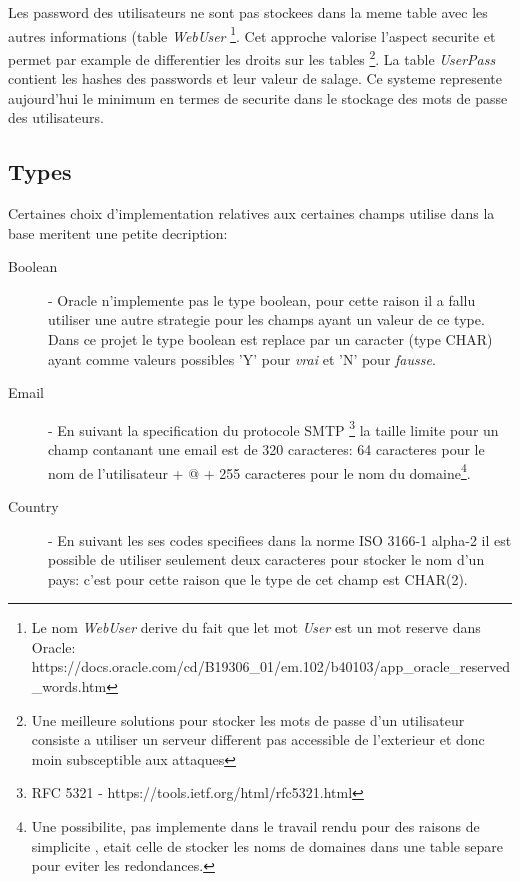 \documentclass[twoside,openright,a4paper,11pt,french]{article}
\begin{document}
Les password des utilisateurs ne sont pas stockees dans la meme table avec les
autres informations (table {\it WebUser}
\footnote{Le nom {\it WebUser} derive du fait que let mot {\it User} est un mot reserve dans Oracle:
https://docs.oracle.com/cd/B19306\_01/em.102/b40103/app\_oracle\_reserved\_words.htm}.
Cet approche valorise l'aspect securite et permet par
example de differentier les droits sur les tables
\footnote{Une meilleure solutions pour stocker les mots de passe d'un
utilisateur consiste a utiliser un serveur different pas accessible de
l'exterieur et donc  moin subsceptible aux attaques}.
La table {\it UserPass} contient les hashes des passwords et leur valeur de
salage.  Ce systeme represente aujourd'hui le minimum en termes de securite
dans le stockage des mots de passe des utilisateurs.


\subsection{Types}
Certaines choix d'implementation relatives aux certaines champs utilise dans la
base meritent une petite decription:


\begin{description}
\item[Boolean] - Oracle n'implemente pas le type boolean, pour cette raison il a
fallu utiliser une autre strategie pour les champs ayant un valeur de ce type.
Dans ce projet le type boolean est replace par un caracter (type CHAR) ayant
comme valeurs possibles 'Y' pour {\it vrai} et 'N' pour {\it fausse}.

\item[Email] - En suivant la specification du protocole SMTP
\footnote{RFC 5321 - https://tools.ietf.org/html/rfc5321.html}
la taille limite pour un champ contanant une email est de 320 caracteres: 64
caracteres pour le nom de l'utilisateur + @ + 255 caracteres pour le nom du
domaine\footnote{Une possibilite, pas implemente dans le travail rendu pour des
raisons de simplicite , etait celle de stocker les noms de domaines dans une
table separe pour eviter les redondances.}.

\item[Country] - En suivant les ses codes specifiees dans la norme ISO 3166-1
alpha-2 il est possible de utiliser seulement deux caracteres pour stocker le
nom d'un pays: c'est pour cette raison que le type de cet champ est CHAR(2).

\end{description}
\end{document}
